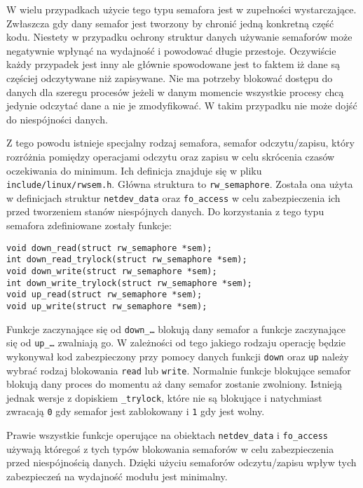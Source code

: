 \documentclass[10pt]{article}
\begin{document}
W wielu przypadkach użycie tego typu semafora jest w zupełności wystarczające. Zwłaszcza gdy dany semafor jest tworzony by chronić jedną konkretną część kodu. Niestety w przypadku ochrony struktur danych używanie semaforów może negatywnie wpłynąć na wydajność i powodować długie przestoje. Oczywiście każdy przypadek jest inny ale głównie spowodowane jest to faktem iż dane są częściej odczytywane niż zapisywane. Nie ma potrzeby blokować dostępu do danych dla szeregu procesów jeżeli w danym momencie wszystkie procesy chcą jedynie odczytać dane a nie je zmodyfikować. W takim przypadku nie może dojść do niespójności danych.

Z tego powodu istnieje specjalny rodzaj semafora, semafor odczytu/zapisu, który rozróżnia pomiędzy operacjami odczytu oraz zapisu w celu skrócenia czasów oczekiwania do minimum. Ich definicja znajduje się w pliku \texttt{include/linux/rwsem.h}. Główna struktura to \texttt{rw\_semaphore}. Została ona użyta w definicjach struktur \texttt{netdev\_data} oraz \texttt{fo\_access} w celu zabezpieczenia ich przed tworzeniem stanów niespójnych danych. Do korzystania z tego typu semafora zdefiniowane zostały funkcje:

\begin{verbatim}
void down_read(struct rw_semaphore *sem);
int down_read_trylock(struct rw_semaphore *sem);
void down_write(struct rw_semaphore *sem);
int down_write_trylock(struct rw_semaphore *sem);
void up_read(struct rw_semaphore *sem);
void up_write(struct rw_semaphore *sem);
\end{verbatim}

Funkcje zaczynające się od \texttt{down\_\ldots} blokują dany semafor a funkcje zaczynające się od \texttt{up\_\ldots} zwalniają go. W zależności od tego jakiego rodzaju operację będzie wykonywał kod zabezpieczony przy pomocy danych funkcji \texttt{down} oraz \texttt{up} należy wybrać rodzaj blokowania \texttt{read} lub \texttt{write}. Normalnie funkcje blokujące semafor blokują dany proces do momentu aż dany semafor zostanie zwolniony. Istnieją jednak wersje z dopiskiem \texttt{\_trylock}, które nie są blokujące i natychmiast zwracają \texttt{0} gdy semafor jest zablokowany i \texttt{1} gdy jest wolny.

Prawie wszystkie funkcje operujące na obiektach \texttt{netdev\_data} i \texttt{fo\_access} używają któregoś z tych typów blokowania semaforów w celu zabezpieczenia przed niespójnością danych. Dzięki użyciu semaforów odczytu/zapisu wpływ tych zabezpieczeń na wydajność modułu jest minimalny.
\end{document}
